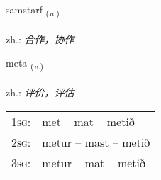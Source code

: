 \documentclass[frontgrid, backgrid]{flacards}\usepackage[]{graphicx}\usepackage[]{xcolor}
\begin{document}
\renewcommand{\flhead}{\vskip5pt \fboxsep=0pt {\small\bfseries\footnotesize Nafnorð | 名词}}
\renewcommand{\fcfoot}{\vskip5pt \fboxsep=0pt \hspace{2pt}{\small\bfseries\footnotesize 1K}}

\renewcommand{\blhead}{\vskip5pt {\small\bfseries\footnotesize Nafnorð | 名词 }}
\renewcommand{\bcfoot}{\vskip5pt \hspace{2pt}{\small\bfseries\footnotesize 1K}}


{samstarf \small{\textsubscript{(\textit{n.})}} \\[1ex] %
\textphonetic{[samstarf]} \\
zh.: \emph{合作，协作} \\  [2ex]
\renewcommand*{\arraystretch}{0.8}
}

\renewcommand{\flhead}{\vskip5pt \fboxsep=0pt {\small\bfseries\footnotesize Sagnorð | 动词}}
\renewcommand{\fcfoot}{\vskip5pt \fboxsep=0pt \hspace{2pt}{\small\bfseries\footnotesize 1K}}

\renewcommand{\blhead}{\vskip5pt {\small\bfseries\footnotesize Sagnorð | 动词 }}
\renewcommand{\bcfoot}{\vskip5pt \hspace{2pt}{\small\bfseries\footnotesize 1K}}


{meta \small{\textsubscript{(\textit{v.})}} \\[1ex] %
\textphonetic{[mɛːta]} \\
zh.: \emph{评价，评估} \\  [2ex]
\renewcommand*{\arraystretch}{0.8}
\begin{tabular}{p{1cm}l}
\textsc{1sg}: & met -- mat -- metið \\ 
\textsc{2sg}: & metur -- mast -- metið \\ 
\textsc{3sg}: & metur -- mat -- metið \\ 
\end{tabular}
}
\end{document}
